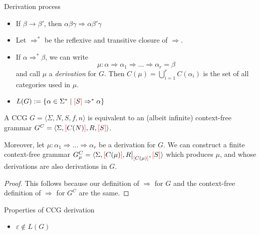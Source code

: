 \documentclass[main.tex]{subfiles}
\begin{document}
\begin{defn}
    Derivation process
    \begin{itemize}
        \item If $\beta \rightarrow \beta'$, then $\alpha \beta \gamma \Rightarrow \alpha \beta' \gamma$
        \item Let $\Rightarrow^*$ be the reflexive and transitive closure of $\Rightarrow$.
        \item If $\alpha \Rightarrow^* \beta$, we can write
            \[ \mu: \alpha \Rightarrow \alpha_1 \Rightarrow ... \Rightarrow \alpha_r = \beta \]
            and call $\mu$ a \emph{derivation} for $G$. Then $C(\mu) = \bigcup\limits_{i=1}^{r} C(\alpha_i)$
            is the set of all categories used in $\mu$.
        \item $L(G) := \{ \alpha \in \Sigma^* \mid \textcolor{red}{[} S \textcolor{red}{]} \Rightarrow^* \alpha \}$
    \end{itemize}
\end{defn}

\begin{prop}\label{prop:cfg}
    A CCG $G = \langle \Sigma, N, S, f, n \rangle$ is equivalent to an
    (albeit infinite) context-free grammar
    $G^C = \langle \Sigma, \textcolor{red}{[} C(N) \textcolor{red}{]}, R, \textcolor{red}{[} S \textcolor{red}{]} \rangle$.

    Moreover, let $\mu: \alpha_1 \Rightarrow ... \Rightarrow \alpha_r$
    be a derivation for $G$.
    We can construct a finite context-free grammar
    $G_\mu^C = \langle \Sigma, \lb C(\mu) \rb, \restr{R}{\lb C(\mu) \rb}, \lb S \rb \rangle$
    which produces $\mu$, and whose derivations are also derivations in $G$.
\end{prop}
\begin{proof}
    This follows because our definition of $\Rightarrow$ for $G$ and the context-free
    definition of $\Rightarrow$ for $G^C$ are the same.
\end{proof}

\begin{prop}
    Properties of CCG derivation
    \begin{itemize}
        \item $\varepsilon \notin L(G)$
    \end{itemize}
\end{prop}
\end{document}
